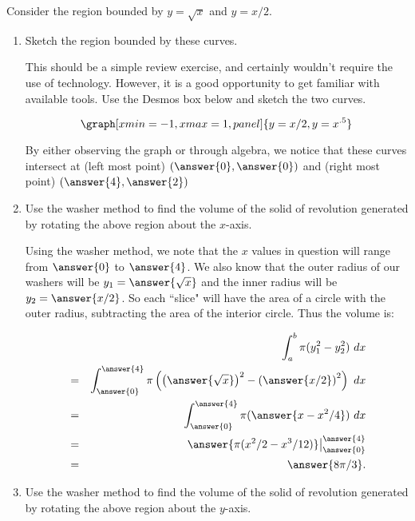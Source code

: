 \documentclass{ximera}
\begin{document}
\begin{question}
Consider the region bounded by $y=\sqrt{x}$ and $y=x/2$.
\begin{enumerate}
\item Sketch the region bounded by these curves.
\begin{explanation}
This should be a simple review exercise, and certainly wouldn't require the use of technology.  However, it is a good opportunity to get familiar with available tools.  Use the Desmos box below and sketch the two curves.

\begin{onlineOnly}
$$\graph[xmin=-1,xmax=1, panel]{y=x/2,y=x^{.5}}$$
\end{onlineOnly}

By either observing the graph or through algebra, we notice that these curves intersect at (left most point) $(\answer{0}, \answer{0})$ and (right most point) $(\answer{4}, \answer{2})$

\end{explanation}

\item Use the washer method to find the volume of the solid of revolution generated by rotating the above region about the $x$-axis.

\begin{explanation}
Using the washer method, we note that the $x$ values in question will range from $\answer{0}$ to $\answer{4}$.  We also know that the outer radius of our washers will be $y_1=\answer{\sqrt{x}}$ and the inner radius will be $y_2=\answer{x/2}$.  So each ``slice" will have the area of a circle with the outer radius, subtracting the area of the interior circle.  Thus the volume is:

\begin{eqnarray*}
&&\int_a^b \pi(y_1^2-y_2^2)\ dx\\
&=&\int_{\answer{0}}^{\answer{4}} \pi\left(   \left( \answer{\sqrt{x}}\right)^2  - \left( \answer{x/2}\right)^2   \right)\ dx\\
&=&\int_{\answer{0}}^{\answer{4}} \pi(\answer{x-x^2/4})\ dx\\
&=&\answer{\pi(x^2/2-x^3/12)}\big|_{\answer{0}}^{\answer{4}}\\
&=&\answer{8\pi/3}.
\end{eqnarray*}



\end{explanation}

\item Use the washer method to find the volume of the solid of revolution generated by rotating the above region about the $y$-axis.


\end{enumerate}
\end{question}
\end{document}
